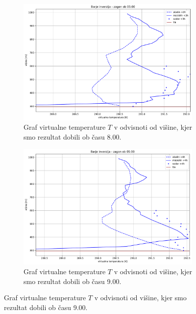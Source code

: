 \documentclass[mat2, tisk]{fmfdelo}
\begin{document}
\begin{figure}[h!]
  \centering
  \begin{subfigure}[b]{1\textwidth}
    \centering
    \includegraphics[width=\textwidth]{rezultati/tv_barje_long_3.pdf}
    \caption{Graf virtualne temperature $T$ v odvisnoti od višine, kjer smo 
    rezultat dobili ob času 8.00.}
    \label{fig:planica}
  \end{subfigure}\hfill
  \begin{subfigure}[b]{1\textwidth}
    \centering
    \includegraphics[width=\textwidth]{rezultati/tv_barje_long_4.pdf}
    \caption{Graf virtualne temperature $T$ v odvisnoti od višine, kjer smo 
    rezultat dobili ob času 9.00.}
    \label{fig:barje}
  \end{subfigure}
  \label{fig:orography_sidebyside}
\end{figure}
\end{document}
